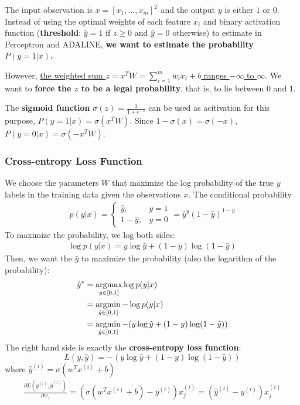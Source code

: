 \documentclass[11pt,a4paper]{article}
\newcommand{\argmax}{\operatornamewithlimits{argmax}}
\newcommand{\argmin}{\operatornamewithlimits{argmin}}
\begin{document}
The input observation is $x=[x_1,...,x_m]^T$ and the output $y$ is either $1$ or $0$. Instead of using the optimal weights of each feature $x_i$ and binary activation function (\textbf{threshold}: $\hat{y}=1$ if $z\geq 0$ and $\hat{y}=0$ otherwise) to estimate  in Perceptron and ADALINE, \textbf{we want to estimate the probability $P(y=1|x)$.}

However, \underline{the weighted sum $z=x^TW=\sum_{i=1}^mw_ix_i+b$ ranges $-\infty$ to $\infty$}. We want to \textbf{force the $z$ to be a legal probability}, that is, to lie between $0$ and $1$.

The \textbf{sigmoid function} $\sigma(z)=\frac{1}{1+e^{-z}}$ can be used as acitivation for this purpose, $P(y=1|x)=\sigma(x^TW)$. Since $1-\sigma(x)=\sigma(-x)$, $P(y=0|x)=\sigma(-x^TW)$.

\subsubsection{Cross-entropy Loss Function}
We choose the parameters $W$ that maximize the log probability of the true $y$ labels in the training data given the observations $x$. The conditional probability
\begin{equation}
    \begin{aligned}
        p(y|x)=\left\{\begin{matrix}
            \hat{y},&y=1\\
            1-\hat{y},&y=0
        \end{matrix}\right.=\hat{y}^y(1-\hat{y})^{1-y}
    \end{aligned}
    \nonumber
\end{equation}
To maximize the probability, we log both sides:
\begin{equation}
    \begin{aligned}
        \log p(y|x)=y\log\hat{y}+(1-y)\log(1-\hat{y})
    \end{aligned}
    \nonumber
\end{equation}
Then, we want the $\hat{y}$ to maximize the probability (also the logarithm of the probability):
\begin{equation}
    \begin{aligned}
        \hat{y}^*&=\argmax_{\hat{y}\in[0,1]}\log p(y|x)\\
        &=\argmin_{\hat{y}\in[0,1]}-\log p(y|x)\\
        &=\argmin_{\hat{y}\in[0,1]}-(y\log\hat{y}+(1-y)\log(1-\hat{y}))
    \end{aligned}
    \nonumber
\end{equation}
The right hand side is exactly the \textbf{cross-entropy loss function}:
$$L(y,\hat{y})=-(y\log\hat{y}+(1-y)\log(1-\hat{y}))$$
where $\hat{y}^{(i)}=\sigma(w^Tx^{(i)}+b)$
\begin{equation}
    \begin{aligned}
        \frac{\partial L(y^{(i)},\hat{y}^{(i)})}{\partial w_j}=\left(\sigma(w^Tx^{(i)}+b)-y^{(i)}\right)x_j^{(i)}=(\hat{y}^{(i)}-y^{(i)})x_j^{(i)}
    \end{aligned}
    \nonumber
\end{equation}
\end{document}
